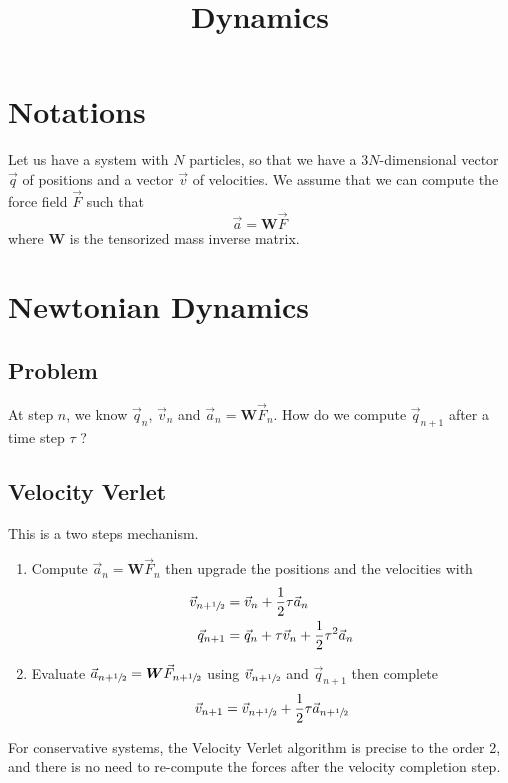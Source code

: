 \documentclass[aps,twocolumn]{revtex4}
\newcommand{\mymat}[1]{\boldsymbol{#1}}
\newcommand{\half}{\sfrac{1}{2}}
\begin{document}
\title{Dynamics}

\section{Notations}
Let us have a system with $N$ particles, so that we have a $3N$-dimensional
vector $\vec{q}$ of positions and a vector $\vec{v}$ of velocities.
We assume that we can compute the force field $\vec{F}$ such that
\begin{equation}
	\vec{a} = \mymat{W} \vec{F}
\end{equation}
where $\mymat{W}$ is the tensorized mass inverse matrix.

\section{Newtonian Dynamics}

\subsection{Problem}
At step $n$, we know $\vec{q}_n$, $\vec{v}_n$ and $\vec{a}_n = \mymat{W} \vec{F}_n$.
How do we compute $\vec{q}_{n+1}$ after a time step $\tau$ ?

\subsection{Velocity Verlet}
This is a two steps mechanism.
\begin{enumerate}
	\item
	Compute $\vec{a}_n = \mymat{W} \vec{F}_n$ then 
	upgrade the positions and the velocities with
	\begin{align}
	\vec{v}_{n+\half} & = \vec{v}_{n} + \dfrac{1}{2} \tau \vec{a}_n \\
	\vec{q}_{n+1}           & = \vec{q}_{n}       + \tau \vec{v}_{n} + \dfrac{1}{2}{\tau^2} \vec{a}_n
	\end{align}

	\item 
	Evaluate $\vec{a}_{n+\half} = \mymat{W} \vec{F}_{n+\half}$  using $\vec{v}_{n+\half}$ and $\vec{q}_{n+1}$ 
	then complete
	\begin{equation}
		\vec{v}_{n+1} = \vec{v}_{n+\half} + \dfrac{1}{2} \tau \vec{a}_{n+\half}
	\end{equation}

\end{enumerate}

For conservative systems, the Velocity Verlet algorithm is precise to the order 2, and there is
no need to re-compute the forces after the velocity completion step.
\end{document}
